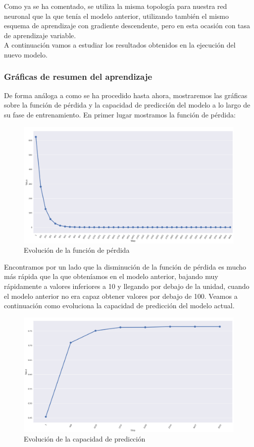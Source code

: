 \documentclass[11pt]{article}
\theoremstyle{plain}
\theoremstyle{definition}
\begin{document}
Como ya se ha comentado, se utiliza la misma topología para nuestra
red neuronal que la que tenía el modelo anterior, utilizando también
el mismo esquema de aprendizaje con gradiente descendente, pero en
esta
ocasión con tasa de aprendizaje variable.\\

A continuación vamos a estudiar los resultados obtenidos en la
ejecución del nuevo modelo.

\subsubsection{Gráficas de resumen del aprendizaje}

De forma análoga a como se ha procedido hasta ahora, mostraremos las
gráficas sobre la función de pérdida y la capacidad de predicción del
modelo a lo largo de su fase de entrenamiento. En primer lugar
mostramos la función de pérdida:

\begin{figure}[H]
  \centering \includegraphics[width=.95\textwidth]{imgs/loss_vlr_wd}
  \caption{Evolución de la función de pérdida}
\end{figure}


Encontramos por un lado que la disminución de la función de pérdida es
mucho más rápida que la que obteníamos en el modelo anterior, bajando
muy rápidamente a valores inferiores a 10 y llegando por debajo de la
unidad, cuando el modelo anterior no era capaz obtener valores por
debajo de 100. Veamos a continuación como evoluciona la capacidad de
predicción del modelo actual.

\begin{figure}[H]
  \centering
  \includegraphics[width=.95\textwidth]{imgs/accuracy_vlr_wd}
  \caption{Evolución de la capacidad de predicción}
\end{figure}
\end{document}
